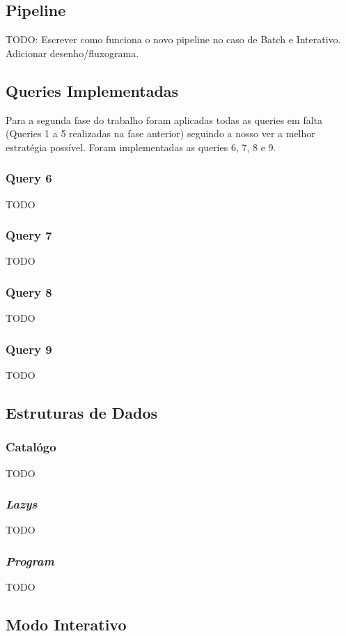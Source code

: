 \documentclass{article}
\begin{document}
    \subsection{Pipeline}
        TODO: Escrever como funciona o novo pipeline no caso de Batch e Interativo.
        Adicionar desenho/fluxograma.
    \subsection{Queries Implementadas}
        Para a segunda fase do trabalho foram aplicadas todas as queries em falta
        (Queries 1 a 5 realizadas na fase anterior) seguindo a nosso ver a melhor
        estratégia possível. Foram implementadas as queries 6, 7, 8 e 9.
        \subsubsection{Query 6}
            TODO
        \subsubsection{Query 7}
            TODO
        \subsubsection{Query 8}
            TODO
        \subsubsection{Query 9}
            TODO
    \subsection{Estruturas de Dados}
        \subsubsection{Catalógo}
            TODO
        \subsubsection{\emph{Lazys}}
            TODO
        \subsubsection{\emph{Program}}
            TODO
    \subsection{Modo Interativo}
\end{document}
